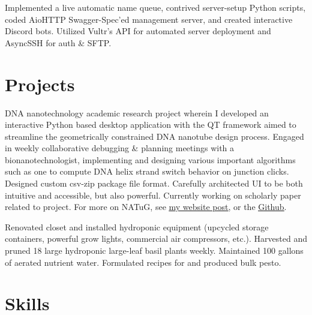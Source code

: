 \documentclass[letterpaper, 10pt]{article}
\begin{document}
		{Implemented a live automatic name queue, contrived server-setup Python scripts, coded AioHTTP Swagger-Spec'ed management server, and created interactive Discord bots. Utilized Vultr's API for automated server deployment and AsyncSSH for auth \& SFTP.}
	\resumeItemListEnd
	
	\resumeSubHeadingListEnd
	
	\section{Projects}
	\resumeSubHeadingListStart
		{DNA nanotechnology academic research project wherein I developed an interactive Python based desktop application with the QT framework aimed to streamline the geometrically constrained DNA nanotube design process. Engaged in weekly collaborative debugging \& planning meetings with a bionanotechnologist, implementing and designing various important algorithms such as one to compute DNA helix strand switch behavior on junction clicks. Designed custom csv-zip package file format. Carefully architected UI to be both intuitive and accessible, but also powerful. Currently working on scholarly paper related to project. For more on NATuG, see \href{https://404wolf.com/posts/projects/DNANanotubes}{\ul{my website post}}, or the \href{https://github.com/NATuG3/NATuG3}{\ul{Github}}.}
		
		{Renovated closet and installed hydroponic equipment (upcycled storage containers, powerful grow lights, commercial air compressors, etc.). Harvested and pruned 18 large hydroponic large-leaf basil plants weekly. Maintained 100 gallons of aerated nutrient water. Formulated recipes for and produced bulk pesto.}
	\resumeSubHeadingListEnd
	
	\section{Skills}
	\resumeSubHeadingListStart
	
	
	
	\resumeSubHeadingListEnd
\end{document}
